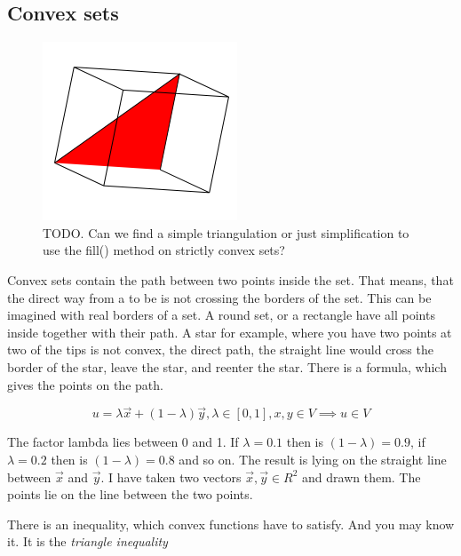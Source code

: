 \documentclass[a4paper]{article}
\begin{document}
\subsection{Convex sets}

\begin{flushleft}
\begin{figure}[ht]

\includegraphics[scale=0.5]{filling.png}
\caption{TODO. Can we find a simple triangulation or just simplification to use the fill() method on strictly convex sets?}

\end{figure}
\end{flushleft}


Convex sets contain the path between two points inside the set. That means, that the direct way from a to be is not crossing the borders of the set. This can be imagined with real borders of a set. A round set, or a rectangle have all points inside together with their path. A star for example, where you have two points at two of the tips is not convex, the direct path, the straight line would cross the border of the star, leave the star, and reenter the star. There is a formula, which gives the points on the path.

\begin{displaymath}
u = \lambda\vec{x} + (1-\lambda)\vec{y}, \lambda \in [0,1], x,y \in V \implies u \in V
\end{displaymath}

The factor lambda lies between 0 and 1. If $\lambda = 0.1$ then is $(1-\lambda) = 0.9$, if $\lambda = 0.2$ then is $(1-\lambda) = 0.8$ and so on. The result is lying on the straight line between $\vec{x}$ and $\vec{y}$. I have taken two vectors $\vec{x}, \vec{y} \in R^2$ and drawn them. The points lie on the line between the two points.

There is an inequality, which convex functions have to satisfy. And you may know it. It is the \emph{triangle inequality}
\end{document}
